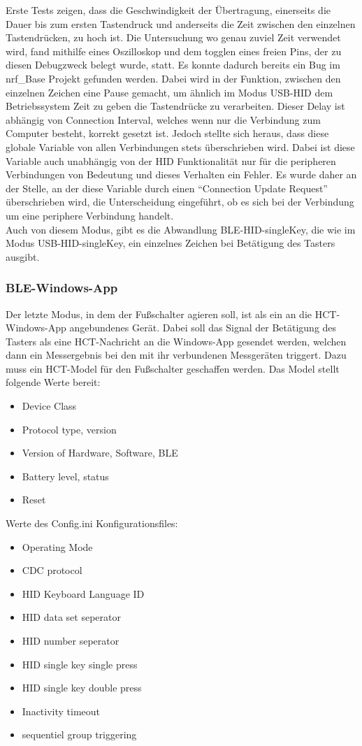 Erste Tests zeigen, dass die Geschwindigkeit der Übertragung, einerseits die Dauer bis zum ersten Tastendruck und anderseits die Zeit zwischen den einzelnen Tastendrücken, zu hoch ist. Die Untersuchung wo genau zuviel Zeit verwendet wird, fand mithilfe eines Oszilloskop und dem togglen eines freien Pins, der zu diesen Debugzweck belegt wurde, statt. Es konnte dadurch bereits ein Bug im nrf\_Base Projekt gefunden werden. Dabei wird in der Funktion, zwischen den einzelnen Zeichen eine Pause gemacht, um ähnlich im Modus USB-\ac{HID} dem Betriebssystem Zeit zu geben die Tastendrücke zu verarbeiten. Dieser Delay ist abhängig von Connection Interval, welches wenn nur die Verbindung zum Computer besteht, korrekt gesetzt ist. Jedoch stellte sich heraus, dass diese globale Variable von allen Verbindungen stets überschrieben wird. Dabei ist diese Variable auch unabhängig von der \ac{HID} Funktionalität nur für die peripheren Verbindungen von Bedeutung und dieses Verhalten ein Fehler. Es wurde daher an der Stelle, an der diese Variable durch einen ``Connection Update Request'' überschrieben wird, die Unterscheidung eingeführt, ob es sich bei der Verbindung um eine periphere Verbindung handelt.\\
Auch von diesem Modus, gibt es die Abwandlung \ac{BLE}-\ac{HID}-singleKey, die wie im Modus USB-\ac{HID}-singleKey, ein einzelnes Zeichen bei Betätigung des Tasters ausgibt.


\subsubsection{BLE-Windows-App}
Der letzte Modus, in dem der Fußschalter agieren soll, ist als ein an die \ac{HCT}-Windows-App angebundenes Gerät. Dabei soll das Signal der Betätigung des Tasters als eine \ac{HCT}-Nachricht an die Windows-App gesendet werden, welchen dann ein Messergebnis bei den mit ihr verbundenen Messgeräten triggert. Dazu muss ein \ac{HCT}-Model für den Fußschalter geschaffen werden. Das Model stellt folgende Werte bereit:
\begin{itemize}
	\item Device Class
	\item Protocol type, version 
	\item Version of Hardware, Software, \ac{BLE}
	\item Battery level, status
	\item Reset 
\end{itemize}

Werte des Config.ini Konfigurationsfiles:
\begin{itemize}
	\item Operating Mode 
	\item \ac{CDC} protocol 
	\item HID Keyboard Language ID 
	\item HID data set seperator 
	\item HID number seperator
	\item HID single key single press
	\item HID single key double press
	\item Inactivity timeout
	\item sequentiel group triggering 
\end{itemize}

